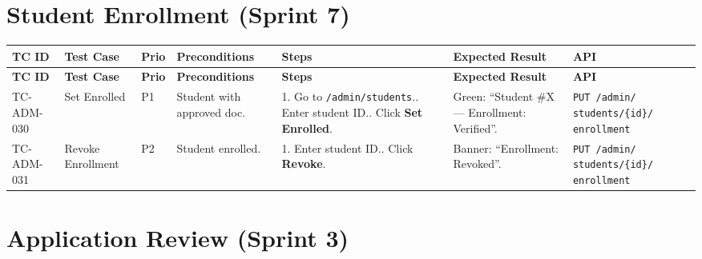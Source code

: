 \documentclass[12pt,a4paper]{article}
\begin{document}
\section{Student Enrollment (Sprint 7)}

\begin{longtable}{L{2cm} L{3cm} L{1cm} L{4cm} L{5.5cm} L{5.5cm} L{3cm}}
\toprule
\textbf{TC ID} & \textbf{Test Case} & \textbf{Prio} & \textbf{Preconditions} & \textbf{Steps} & \textbf{Expected Result} & \textbf{API} \\
\midrule
\endfirsthead \toprule \textbf{TC ID} & \textbf{Test Case} & \textbf{Prio} & \textbf{Preconditions} & \textbf{Steps} & \textbf{Expected Result} & \textbf{API} \\ \midrule \endhead \bottomrule \endfoot

TC-ADM-030 & Set Enrolled & P1 & Student with approved doc. & 1. Go to \texttt{/admin/students}.. Enter student ID.. Click \textbf{Set Enrolled}. & Green: ``Student \#X --- Enrollment: Verified''. & \texttt{PUT /admin/ students/\{id\}/ enrollment} \\
\midrule
TC-ADM-031 & Revoke Enrollment & P2 & Student enrolled. & 1. Enter student ID.. Click \textbf{Revoke}. & Banner: ``Enrollment: Revoked''. & \texttt{PUT /admin/ students/\{id\}/ enrollment} \\
\end{longtable}

\section{Application Review (Sprint 3)}
\end{document}
